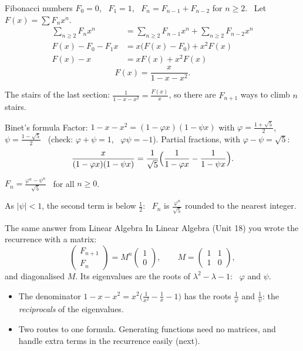 \documentclass{wosm-slides}
\begin{document}
\begin{frame}{Fibonacci numbers}
  $F_0 = 0$, \ $F_1 = 1$, \ $F_n = F_{n-1} + F_{n-2}$ for $n \ge 2$. \ Let $F(x) = \sum F_n x^n$.
  \pause
  \begin{align*}
    \sum_{n \ge 2} F_n x^n &= \sum_{n \ge 2} F_{n-1} x^n + \sum_{n \ge 2} F_{n-2} x^n \\
    F(x) - F_0 - F_1 x &= x \bigl(F(x) - F_0\bigr) + x^2 F(x) \\
    F(x) - x &= x F(x) + x^2 F(x)
  \end{align*}
  \pause
  \[ F(x) = \frac{x}{1 - x - x^2} . \]
  {\small The stairs of the last section: $\frac{1}{1 - x - x^2} = \frac{F(x)}{x}$, so there are
  $F_{n+1}$ ways to climb $n$ stairs.\par}
\end{frame}

\begin{frame}{Binet's formula}
  Factor: $1 - x - x^2 = (1 - \varphi x)(1 - \psi x)$ with
  $\varphi = \frac{1 + \sqrt5}{2}$, \ $\psi = \frac{1 - \sqrt5}{2}$ \
  (check: $\varphi + \psi = 1$, \ $\varphi\psi = -1$).
  \pause
  Partial fractions, with $\varphi - \psi = \sqrt5$:
  \[ \frac{x}{(1 - \varphi x)(1 - \psi x)}
     = \frac{1}{\sqrt5}\Bigl( \frac{1}{1 - \varphi x} - \frac{1}{1 - \psi x} \Bigr) . \]
  \pause
  \begin{theorem}
    $\displaystyle F_n = \frac{\varphi^n - \psi^n}{\sqrt5}$ \ for all $n \ge 0$.
  \end{theorem}
  {\small As $|\psi| < 1$, the second term is below $\frac12$: \ $F_n$ is $\frac{\varphi^n}{\sqrt5}$
  rounded to the nearest integer.\par}
\end{frame}

\begin{frame}{The same answer from Linear Algebra}
  In Linear Algebra (Unit 18) you wrote the recurrence with a matrix:
  \[ \begin{pmatrix} F_{n+1} \\ F_n \end{pmatrix}
     = M^n \begin{pmatrix} 1 \\ 0 \end{pmatrix}, \qquad
     M = \begin{pmatrix} 1 & 1 \\ 1 & 0 \end{pmatrix}, \]
  and diagonalised $M$. Its eigenvalues are the roots of $\lambda^2 - \lambda - 1$: \ $\varphi$ and $\psi$.
  \pause
  \begin{itemize}
    \item The denominator $1 - x - x^2 = x^2 \bigl(\frac{1}{x^2} - \frac1x - 1\bigr)$ has the
      roots $\frac{1}{\varphi}$ and $\frac{1}{\psi}$: the \emph{reciprocals} of the eigenvalues.
    \item Two routes to one formula. Generating functions need no matrices, and handle extra
      terms in the recurrence easily (next).
  \end{itemize}
\end{frame}
\end{document}
